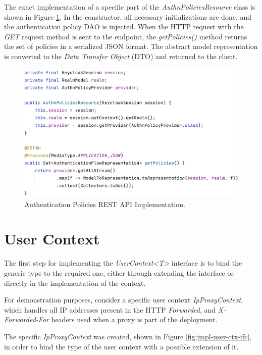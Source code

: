 The exact implementation of a specific part of the \textit{AuthnPoliciesResource} class is shown in Figure \ref{fig:impl-authn-policies-rest-impl}.
In the constructor, all necessary initializations are done, and the authentication policy DAO is injected.
When the HTTP request with the \textit{GET} request method is sent to the endpoint, the \textit{getPolicies()} method returns the set of policies in a serialized JSON format.
The abstract model representation is converted to the \textit{Data Transfer Object} (DTO) and returned to the client.

\begin{figure}[htbp]
  \centering
  \includegraphics[width=1\textwidth]{img/sections/6-implementation/authn-policy-rest-example.png}
  \caption{Authentication Policies REST API Implementation.}
  \label{fig:impl-authn-policies-rest-impl}
\end{figure}

\newpage
\section{User Context}
The first step for implementing the \textit{UserContext<T>} interface is to bind the generic type to the required one, either through extending the interface or directly in the implementation of the context.

For demonstration purposes, consider a specific user context \textit{IpProxyContext}, which handles all IP addresses present in the HTTP \textit{Forwarded}, and \textit{X-Forwarded-For} headers used when a proxy is part of the deployment.

The specific \textit{IpProxyContext} was created, shown in Figure \ref{fig:impl-user-ctx-ifc}, in order to bind the type of the user context with a possible extension of it.

